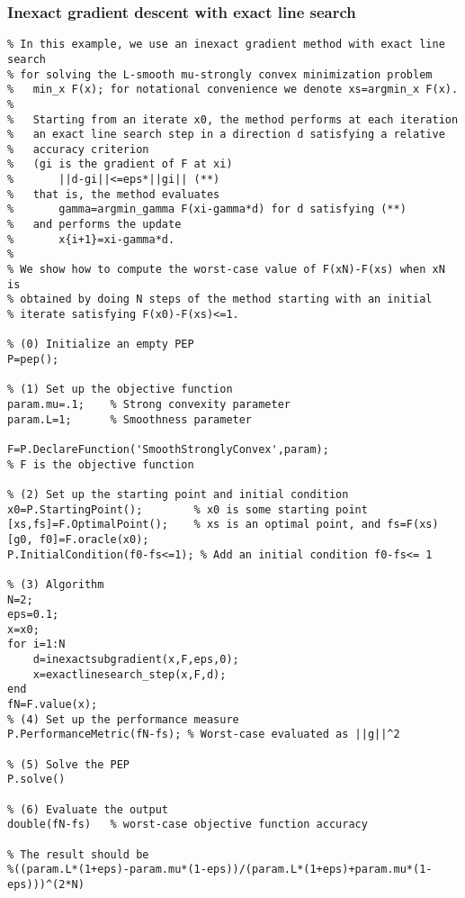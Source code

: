 \documentclass[11pt,a4paper]{article}
\begin{document}
\subsubsection{Inexact gradient descent with exact line search}\label{ex:inexactLS}
\begin{lstlisting}
% In this example, we use an inexact gradient method with exact line search
% for solving the L-smooth mu-strongly convex minimization problem
%   min_x F(x); for notational convenience we denote xs=argmin_x F(x).
%
%   Starting from an iterate x0, the method performs at each iteration
%   an exact line search step in a direction d satisfying a relative 
%   accuracy criterion
%   (gi is the gradient of F at xi)
%       ||d-gi||<=eps*||gi|| (**)
%   that is, the method evaluates
%       gamma=argmin_gamma F(xi-gamma*d) for d satisfying (**)
%   and performs the update
%       x{i+1}=xi-gamma*d.
%
% We show how to compute the worst-case value of F(xN)-F(xs) when xN is
% obtained by doing N steps of the method starting with an initial
% iterate satisfying F(x0)-F(xs)<=1.

% (0) Initialize an empty PEP
P=pep();

% (1) Set up the objective function
param.mu=.1;	% Strong convexity parameter
param.L=1;      % Smoothness parameter

F=P.DeclareFunction('SmoothStronglyConvex',param); 
% F is the objective function

% (2) Set up the starting point and initial condition
x0=P.StartingPoint();		 % x0 is some starting point
[xs,fs]=F.OptimalPoint(); 	 % xs is an optimal point, and fs=F(xs)
[g0, f0]=F.oracle(x0);               
P.InitialCondition(f0-fs<=1); % Add an initial condition f0-fs<= 1

% (3) Algorithm
N=2;
eps=0.1;
x=x0;
for i=1:N
    d=inexactsubgradient(x,F,eps,0);
    x=exactlinesearch_step(x,F,d);
end
fN=F.value(x);
% (4) Set up the performance measure
P.PerformanceMetric(fN-fs); % Worst-case evaluated as ||g||^2

% (5) Solve the PEP
P.solve()

% (6) Evaluate the output
double(fN-fs)   % worst-case objective function accuracy

% The result should be
%((param.L*(1+eps)-param.mu*(1-eps))/(param.L*(1+eps)+param.mu*(1-eps)))^(2*N)
\end{lstlisting}
\newpage
\end{document}
